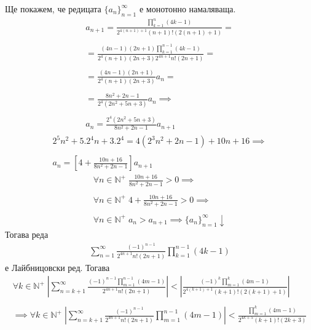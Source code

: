 \documentclass[a4paper,14pt]{extarticle}
\newcommand{\N}{\mathbb{N}}
\begin{document}
Ще покажем, че редицата $\{a_n\}_{n = 1}^\infty$ е монотонно намаляваща.
\begin{align*}
    a_{n + 1} = \displaystyle\frac{\displaystyle\prod_{k = 1}^{n}(4k - 1)}{2^{4(n + 1) + 1}(n + 1)!(2(n + 1) + 1)} = \\\\
    = \displaystyle\frac{(4n - 1)(2n + 1)\displaystyle\prod_{k = 1}^{n - 1}(4k - 1)}{2^4(n + 1)(2n + 3)2^{4n + 1}n!(2n + 1)} = \\\\
    = \frac{(4n - 1)(2n + 1)}{2^4(n + 1)(2n + 3)}a_n  = \\\\
    = \frac{8n^2 + 2n - 1}{2^4(2n^2 + 5n + 3)}a_n \implies \\\\
    a_n = \frac{2^4(2n^2 + 5n + 3)}{8n^2 + 2n - 1}a_{n + 1}
\end{align*}
\begin{align*}
    2^5n^2 + 5.2^4n + 3.2^4 =  4(2^3n^2 + 2n - 1) + 10n + 16 \implies \\\\
    a_n = \left[4 + \frac{10n + 16}{8n^2 + 2n - 1}\right]a_{n + 1}
\end{align*}
\begin{align*}
    \forall n \in \N^+ \; \frac{10n + 16}{8n^2 + 2n - 1} > 0 \implies \\\\
    \forall n \in \N^+ \; 4 + \frac{10n + 16}{8n^2 + 2n - 1} > 0 \implies \\\\
    \forall n \in \N^+ \; a_n > a_{n + 1} \implies \{a_n\}_{n = 1}^\infty \downarrow
\end{align*}
Тогава реда  \begin{align*}
    \displaystyle\sum_{n = 1}^{\infty} \frac{(-1)^{n - 1}}{2^{4n + 1} n! (2n + 1)}\displaystyle\prod_{k = 1}^{n - 1}(4k - 1)
\end{align*} е Лайбницовски ред. Тогава
\begin{align*}
    \forall k \in \N^+ \; \left|\displaystyle\sum_{n = k + 1}^{\infty} \displaystyle\frac{(-1)^{n - 1}\displaystyle\prod_{m = 1}^{n - 1}(4m - 1)}{2^{4n + 1} n! (2n + 1)}\right|
    < \left|\displaystyle\frac{(-1)^{k}\displaystyle\prod_{m = 1}^{k}(4m - 1)}{2^{4(k + 1) + 1} (k + 1)! (2(k + 1) + 1)}\right| \\\\
    \implies \forall k \in \N^+ \; \left|\displaystyle\sum_{n = k + 1}^{\infty} \frac{(-1)^{n - 1}}{2^{4n + 1} n! (2n + 1)}\displaystyle\prod_{m = 1}^{n - 1}(4m - 1)\right|
    < \displaystyle\frac{\displaystyle\prod_{m = 1}^{k}(4m - 1)}{2^{4k + 5}(k + 1)!(2k + 3)}
\end{align*}
\end{document}
